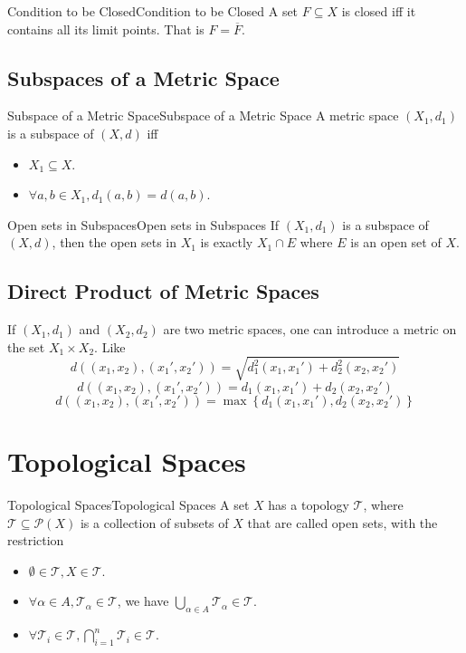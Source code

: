 \documentclass[../main.tex]{subfiles}
\begin{document}
\begin{proposition}{Condition to be Closed}{Condition to be Closed}
A set $F \subseteq X$ is closed iff it contains all its limit points. That is $F = \overline{F}$.
\end{proposition}

\subsection{Subspaces of a Metric Space}
\begin{definition}{Subspace of a Metric Space}{Subspace of a Metric Space}
A metric space $(X_1,d_1)$ is a subspace of $(X,d)$ iff
\begin{itemize}
\item $X_1 \subseteq X$.
\item $\forall a,b\in X_1, d_1(a,b)=d(a,b)$.
\end{itemize}
\end{definition}

\begin{proposition}{Open sets in Subspaces}{Open sets in Subspaces}
If $(X_1,d_1)$ is a subspace of $(X,d)$, then the open sets in $X_1$ is exactly $X_1\cap E$ where $E$ is an open set of $X$.
\end{proposition}

\subsection{Direct Product of Metric Spaces}
If $(X_1,d_1)$ and $(X_2,d_2)$ are two metric spaces, one can introduce a metric on the set $X_1 \times X_2$. Like
\begin{equation*}
d((x_1,x_2),(x_1',x_2')) = \sqrt{d_1^2(x_1,x_1') + d_2^2(x_2,x_2')}
\end{equation*}
\begin{equation*}
d((x_1,x_2),(x_1',x_2')) = d_1(x_1,x_1')+d_2(x_2,x_2')
\end{equation*}
\begin{equation*}
d((x_1,x_2),(x_1',x_2')) = \max \left\{ d_1(x_1,x_1'),d_2(x_2,x_2') \right\}
\end{equation*}


\section{Topological Spaces}
\begin{definition}{Topological Spaces}{Topological Spaces}
A set $X$ has a topology $\mathcal{T}$, where $\mathcal{T} \subseteq \mathcal{P}(X)$ is a collection of subsets of $X$ that are called open sets, with the restriction
\begin{itemize}
\item $\emptyset \in \mathcal{T}, X\in \mathcal{T}$.
\item $\forall \alpha\in A, \mathcal{T}_{\alpha}\in \mathcal{T}$, we have $\bigcup_{\alpha\in A} \mathcal{T}_{\alpha}\in \mathcal{T} $.
\item $\forall \mathcal{T}_i\in \mathcal{T}, \bigcap_{i=1}^{n} \mathcal{T}_i\in \mathcal{T}$.
\end{itemize}
\end{definition}
\end{document}
